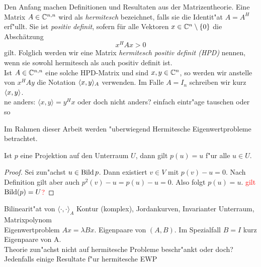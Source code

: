 Den Anfang machen Definitionen und Resultaten aus der Matrizentheorie.
Eine Matrix $A\in\Cnn$ wird als \emph{hermitesch} bezeichnet, falls
sie die Identit"at $A=A^H$ erf"ullt. Sie ist \emph{positiv definit}, sofern
für alle Vektoren $x\in\Co$ die Abschätzung
\[
x^H A x > 0
\]
gilt. Folglich werden wir eine Matrix \emph{hermitesch positiv definit (HPD)}
nennen, wenn sie sowohl hermitesch als auch positiv definit ist.\\

Ist $A\in\Cnn$ eine solche HPD-Matrix und sind $x,y\in\Cn$, so werden wir anstelle von
$x^H A y$ die Notation $\sp{A}{x,y}$ verwenden. Im Falle $A=I_n$ schreiben wir
kurz $\sp{}{x,y}$.\\

ne anders: $\langle x,y \rangle = y^H x$ oder doch nicht anders? einfach eintr"age tauschen oder so

Im Rahmen dieser Arbeit werden "uberwiegend Hermitesche Eigenwertprobleme betrachtet.

\begin{prop}
Ist $p$ eine Projektion auf den Unterraum $U$, dann gilt $p(u) = u$ f"ur
alle $u \in U$.
\end{prop}
\begin{proof}
Sei zun"achst $u \in \Bild{p}$. Dann existiert $v \in V$ mit $p(v) - u = 0$.
Nach Definition gilt aber auch $p^2(v)-u = p(u)-u = 0$. Also folgt $p(u)=u$.
\textcolor{red}{gilt $\Bild(p) = U$?}
\end{proof}

Bilinearit"at von $\langle \cdot, \cdot \rangle_A$
Kontur (komplex), Jordankurven, Invarianter Unterraum, Matrixpolynom\\

Eigenwertproblem $Ax = \lambda Bx$. Eigenpaare von $(A,B)$. Im Spezialfall $B=I$ kurz Eigenpaare von A.\\

Theorie zun"achst nicht auf hermitesche Probleme beschr"ankt oder doch? Jedenfalls einige Resultate f"ur hermitesche EWP
